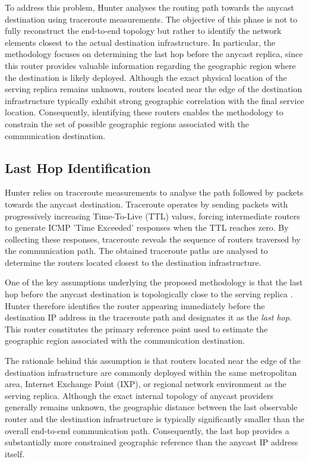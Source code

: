 To address this problem, Hunter analyses the routing path towards the anycast destination using traceroute measurements. The objective of this phase is not to fully reconstruct the end-to-end topology but rather to identify the network elements closest to the actual destination infrastructure. In particular, the methodology focuses on determining the last hop before the anycast replica, since this router provides valuable information regarding the geographic region where the destination is likely deployed. Although the exact physical location of the serving replica remains unknown, routers located near the edge of the destination infrastructure typically exhibit strong geographic correlation with the final service location. Consequently, identifying these routers enables the methodology to constrain the set of possible geographic regions associated with the communication destination.

\subsection{Last Hop Identification}
\label{sc:hunter_tracing_anycast_path_last_hop_identification}

Hunter relies on traceroute measurements to analyse the path followed by packets towards the anycast destination. Traceroute operates by sending packets with progressively increasing Time-To-Live (TTL) values, forcing intermediate routers to generate ICMP 'Time Exceeded' responses when the TTL reaches zero. By collecting these responses, traceroute reveals the sequence of routers traversed by the communication path. The obtained traceroute paths are analysed to determine the routers located closest to the destination infrastructure.

One of the key assumptions underlying the proposed methodology is that the last hop before the anycast destination is topologically close to the serving replica . Hunter therefore identifies the router appearing immediately before the destination IP address in the traceroute path and designates it as the \textit{last hop}. This router constitutes the primary reference point used to estimate the geographic region associated with the communication destination.

The rationale behind this assumption is that routers located near the edge of the destination infrastructure are commonly deployed within the same metropolitan area, Internet Exchange Point (IXP), or regional network environment as the serving replica. Although the exact internal topology of anycast providers generally remains unknown, the geographic distance between the last observable router and the destination infrastructure is typically significantly smaller than the overall end-to-end communication path. Consequently, the last hop provides a substantially more constrained geographic reference than the anycast IP address itself.

